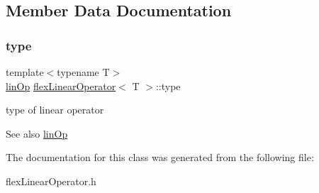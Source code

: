 \subsection{Member Data Documentation}
\mbox{\label{classflex_linear_operator_a80b240d65c64cb9843e28da602995940}} 
\subsubsection{\texorpdfstring{type}{type}}
{\footnotesize\ttfamily template$<$typename T$>$ \\
\hyperlink{tools_8h_a3fc67a2f9370c09fecbd90da67687d36}{lin\+Op} \hyperlink{classflex_linear_operator}{flex\+Linear\+Operator}$<$ T $>$\+::type}



type of linear operator 

\begin{DoxySeeAlso}{See also}
\hyperlink{tools_8h_a3fc67a2f9370c09fecbd90da67687d36}{lin\+Op} 
\end{DoxySeeAlso}


The documentation for this class was generated from the following file\+:\begin{DoxyCompactItemize}
\item 
flex\+Linear\+Operator.\+h\end{DoxyCompactItemize}
